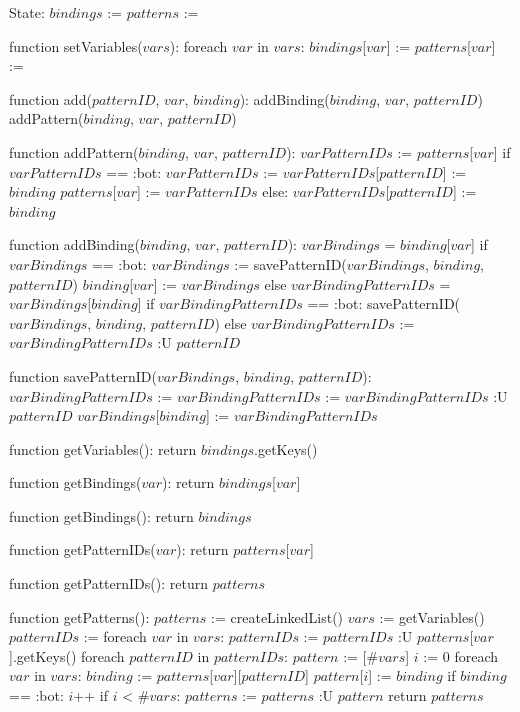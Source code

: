 State:
    $bindings$ := {}
    $patterns$ := {}

function setVariables($vars$):
    foreach $var$ in $vars$:
        $bindings$[$var$] := {}
        $patterns$[$var$] := {}

function add($patternID$, $var$, $binding$):
    addBinding($binding$, $var$, $patternID$)
    addPattern($binding$, $var$, $patternID$)

function addPattern($binding$, $var$, $patternID$):
    $varPatternIDs$ := $patterns$[$var$]
    if $varPatternIDs$ == :bot: 
        $varPatternIDs$ := {}
        $varPatternIDs$[$patternID$] := $binding$
        $patterns$[$var$] := $varPatternIDs$
    else:
        $varPatternIDs$[$patternID$] := $binding$

function addBinding($binding$, $var$, $patternID$):
    $varBindings$ = $binding$[$var$]
    if $varBindings$ == :bot:
        $varBindings$ := {}
        savePatternID($varBindings$, $binding$, $patternID$)
        $binding$[$var$] := $varBindings$
    else 
        $varBindingPatternIDs$ = $varBindings$[$binding$]
        if $varBindingPatternIDs$ == :bot:
            savePatternID($varBindings$, $binding$, $patternID$)
        else 
            $varBindingPatternIDs$ := $varBindingPatternIDs$ :U { $patternID$ } 

function savePatternID($varBindings$, $binding$, $patternID$):
    $varBindingPatternIDs$ := {}
    $varBindingPatternIDs$ := $varBindingPatternIDs$ :U { $patternID$ }
    $varBindings$[$binding$] := $varBindingPatternIDs$

function getVariables():
    return $bindings$.getKeys()

function getBindings($var$):
    return $bindings$[$var$]

function getBindings():
    return $bindings$

function getPatternIDs($var$):
    return $patterns$[$var$]

function getPatternIDs():
    return $patterns$

function getPatterns():
    $patterns$ := createLinkedList()
    $vars$ := getVariables()
    $patternIDs$ := {}
    foreach $var$ in $vars$:
        $patternIDs$ := $patternIDs$ :U $patterns$[$var$].getKeys()
    foreach $patternID$ in $patternIDs$:
        $pattern$ := [$\#vars$]
        $i$ := 0
        foreach $var$ in $vars$:
            $binding$ := $patterns$[$var$][$patternID$]
            $pattern$[$i$] := $binding$
            if $binding$ == :bot:
                $i$++
        if $i$ < $\#vars$:
            $patterns$ := $patterns$ :U { $pattern$ }
    return $patterns$

